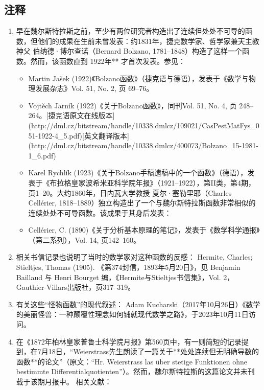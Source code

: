 \subsection{注释}
\begin{enumerate}
\item 早在魏尔斯特拉斯之前，至少有两位研究者构造出了连续但处处不可导的函数，但他们的成果在生前未曾发表：约1831年，捷克数学家、哲学家兼天主教神父 伯纳德·博尔查诺（Bernard Bolzano, 1781–1848）构造了这样一个函数。然而，该函数直到 1922年** 才首次发表。参见：
  \begin{itemize}
  \item Martin Jašek (1922)《Bolzano函数》（捷克语与德语），发表于《数学与物理发展杂志》Vol. 51, No. 2, 页 69–76。
  \item Vojtěch Jarník (1922)《关于Bolzano函数》，同刊Vol. 51, No. 4, 页 248–264。[捷克语原文在线版本](http://dml.cz/bitstream/handle/10338.dmlcz/109021/CasPestMatFys_051-1922-4_5.pdf)[英文翻译版本](http://dml.cz/bitstream/handle/10338.dmlcz/400073/Bolzano_15-1981-1_6.pdf)
  \item Karel Rychlík (1923)《关于Bolzano手稿遗稿中的一个函数》（德语），发表于《布拉格皇家波希米亚科学院年报》（1921–1922），第II类，第4期，页1–20。大约1860年，日内瓦大学教授 夏尔·塞勒里耶（Charles Cellérier, 1818–1889）独立构造出了一个与魏尔斯特拉斯函数非常相似的连续处处不可导函数。该成果于其身后发表：
  \item Cellérier, C. (1890)《关于分析基本原理的笔记》，发表于《数学科学通报》（第二系列），Vol. 14, 页142–160。
  \end{itemize}
\item 相关书信记录也说明了当时的数学家对这种函数的反感：
Hermite, Charles; Stieltjes, Thomas (1905). 《第374封信，1893年5月20日》，见 Benjamin Baillaud 与 Henri Bourget 编，《Hermite与Stieltjes书信集》，Vol. 2，Gauthier-Villars出版社，页317–319。
\item 有关这些“怪物函数”的现代叙述：
Adam Kucharski（2017年10月26日）《数学的美丽怪兽：一种颠覆性理念如何铺就现代数学之路》，于2023年10月11日访问。

\item 在《1872年柏林皇家普鲁士科学院月报》第560页中，有一则简短的记录提到，在7月18日，“Weierstrass先生朗读了一篇关于**处处连续但无明确导数的函数**的论文”（原文：“Hr. Weierstrass las über stetige Funktionen ohne bestimmte Differentialquotienten”）。然而，魏尔斯特拉斯的这篇论文并未刊载于该期月报中。
相关文献：


\end{enumerate}
